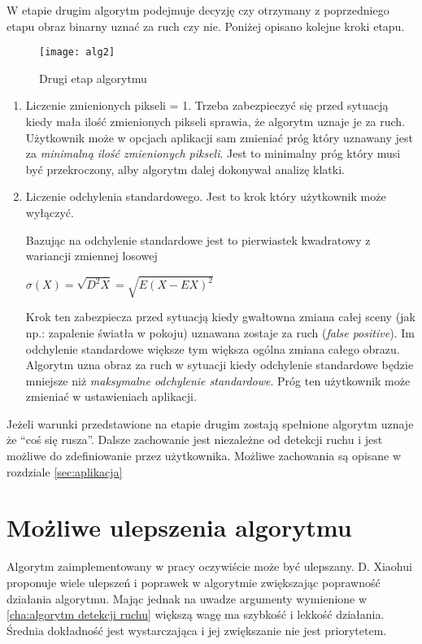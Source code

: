 W etapie drugim algorytm podejmuje decyzję czy otrzymany z poprzedniego etapu obraz binarny uznać za ruch czy nie. Poniżej opisano kolejne kroki etapu.

\begin{figure}[h]
	\centering
	\texttt{[image: alg2]}
	\caption{Drugi etap algorytmu}
	\label{fig:drugi_etap_alg}
\end{figure}

\begin{enumerate}
	\item Liczenie zmienionych pikseli = 1. Trzeba zabezpieczyć się przed sytuacją kiedy mała ilość zmienionych pikseli sprawia, że algorytm uznaje je za ruch. Użytkownik może w opcjach aplikacji sam zmieniać próg który uznawany jest za {\it minimalną ilość zmienionych pikseli}. Jest to minimalny próg który musi być przekroczony, alby algorytm dalej dokonywał analizę klatki. 

	\item Liczenie odchylenia standardowego. Jest to krok który użytkownik może wyłączyć.
	
	Bazując na \cite{Pwn} odchylenie standardowe jest to pierwiastek kwadratowy z wariancji zmiennej losowej
	
	$\sigma(X) = \sqrt{D^2X} = \sqrt{E(X - EX)^2}$
	
	Krok ten zabezpiecza przed sytuacją kiedy gwałtowna zmiana całej sceny (jak np.: zapalenie światła w pokoju) uznawana zostaje za ruch ({\it false positive}). Im odchylenie standardowe większe tym większa ogólna zmiana całego obrazu. Algorytm uzna obraz za ruch w sytuacji kiedy odchylenie standardowe będzie mniejsze niż {\it maksymalne odchylenie standardowe}. Próg ten użytkownik może zmieniać w ustawieniach aplikacji. 
	
\end{enumerate}

Jeżeli warunki przedstawione na etapie drugim zostają spełnione algorytm uznaje że ``coś się rusza''. Dalsze zachowanie jest niezależne od detekcji ruchu i jest możliwe do zdefiniowanie przez użytkownika. Możliwe zachowania są opisane w rozdziale \ref{sec:aplikacja}


\section{Możliwe ulepszenia algorytmu}
\label{sec:ulepszenia}

Algorytm zaimplementowany w pracy oczywiście może być ulepszany. D. Xiaohui \cite{Motiondet} proponuje wiele ulepszeń i poprawek w algorytmie zwiększając poprawność działania algorytmu. Mając jednak na uwadze argumenty wymienione w \ref{cha:algorytm detekcji ruchu} większą wagę ma szybkość i lekkość działania. Średnia dokładność jest wystarczająca i jej zwiększanie nie jest priorytetem. 

